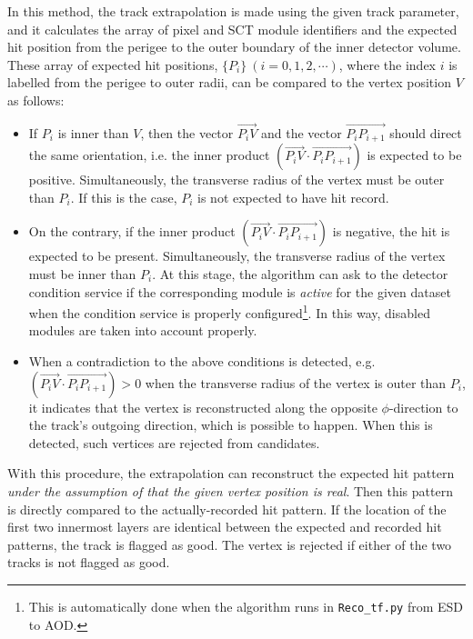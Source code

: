 \begin{enumerate}
In this method, the track extrapolation is made using the given track parameter, and it calculates the array of pixel and SCT module identifiers and the expected hit position from the perigee to the outer boundary of the inner detector volume. These array of expected hit positions, $\{P_{i}\}~(i=0, 1, 2,\cdots)$, where the index $i$ is labelled from the perigee to outer radii, can be compared to the vertex position $V$ as follows:
  \begin{itemize}
  \item If $P_{i}$ is inner than $V$, then the vector $\overrightarrow{P_{i}V}$ and the vector $\overrightarrow{P_{i}P_{i+1}}$ should direct the same orientation, i.e. the inner product $(\overrightarrow{P_{i}V}\cdot\overrightarrow{P_{i}P_{i+1}})$ is expected to be positive. Simultaneously, the transverse radius of the vertex must be outer than $P_{i}$. If this is the case, $P_{i}$ is not expected to have hit record.
  \item On the contrary, if the inner product $(\overrightarrow{P_{i}V}\cdot\overrightarrow{P_{i}P_{i+1}})$ is negative, the hit is expected to be present. Simultaneously, the transverse radius of the vertex must be inner than $P_{i}$. At this stage, the algorithm can ask to the detector condition service if the corresponding module is \emph{active} for the given dataset when the condition service is properly configured\footnote{This is automatically done when the algorithm runs in {\tt Reco\_tf.py} from ESD to AOD.}. In this way, disabled modules are taken into account properly.
  \item When a contradiction to the above conditions is detected, e.g.~$(\overrightarrow{P_{i}V}\cdot\overrightarrow{P_{i}P_{i+1}})>0$ when the transverse radius of the vertex is outer than $P_{i}$, it indicates that the vertex is reconstructed along the opposite $\phi$-direction to the track's outgoing direction, which is possible to happen. When this is detected, such vertices are rejected from candidates.
  \end{itemize}
  With this procedure, the extrapolation can reconstruct the expected hit pattern \emph{under the assumption of that the given vertex position is real}. Then this pattern is directly compared to the actually-recorded hit pattern. If the location of the first two innermost layers are identical between the expected and recorded hit patterns, the track is flagged as good. The vertex is rejected if either of the two tracks is not flagged as good.
\end{enumerate}

